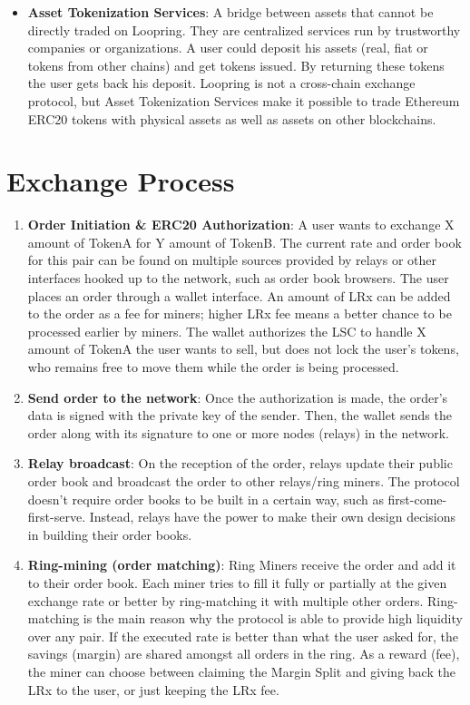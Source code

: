 \documentclass[UTF8,nofonts]{article}
\begin{document}
\begin{multicols}{2}
\begin{itemize}
\item \textbf{Asset Tokenization Services}: A bridge between assets that cannot be directly traded on Loopring. They are centralized services run by trustworthy companies or organizations. A user could deposit his assets (real, fiat or tokens from other chains) and get tokens issued. By returning these tokens the user gets back his deposit. Loopring is not a cross-chain exchange protocol, but Asset Tokenization Services make it possible to trade Ethereum ERC20 \cite{ERC20} tokens with physical assets as well as assets on other blockchains. 

\end{itemize}


\section{Exchange Process\label{sec:process}}
\begin{enumerate} 

\item \textbf{Order Initiation \& ERC20 Authorization}: A user wants to exchange X amount of TokenA for Y amount of TokenB. The current rate and order book for this pair can be found on multiple sources provided by relays or other interfaces hooked up to the network, such as order book browsers. The user places an order through a wallet interface. An amount of LRx can be added to the order as a fee for miners; higher LRx fee means a better chance to be processed earlier by miners. The wallet authorizes the LSC to handle X amount of TokenA the user wants to sell, but does not lock the user's tokens, who remains free to move them while the order is being processed.

\item \textbf{Send order to the network}: Once the authorization is made, the order's data is signed with the private key of the sender. Then, the wallet sends the order along with its signature to one or more nodes (relays) in the network.

\item \textbf{Relay broadcast}: On the reception of the order, relays update their public order book and broadcast the order to other relays/ring miners. The protocol doesn't require order books to be built in a certain way, such as first-come-first-serve. Instead, relays have the power to make their own design decisions in building their order books.

\item \textbf{Ring-mining (order matching)}: Ring Miners receive the order and add it to their order book. Each miner tries to fill it fully or partially at the given exchange rate or better by ring-matching it with multiple other orders. Ring-matching is the main reason why the protocol is able to provide high liquidity over any pair. If the executed rate is better than what the user asked for, the savings (margin) are shared amongst all orders in the ring. As a reward (fee), the miner can choose between claiming the Margin Split and giving back the LRx to the user, or just keeping the LRx fee.


\end{enumerate}
\end{multicols}
\end{document}
